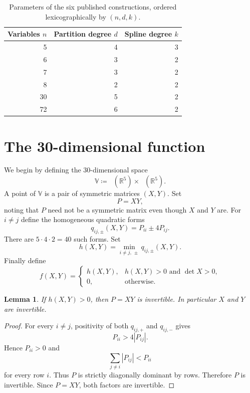 \documentclass[11pt]{amsart}
\newtheorem{lemma}[theorem]{Lemma}
\theoremstyle{remark}
\DeclareMathOperator{\Sym}{\mathsf{S}^2}
\begin{document}
\begin{table}[htb]
\centering
\caption{Parameters of the six published constructions, ordered lexicographically by $(n,d,k)$.}
\label{tab:counterexamples}
\begin{tabular}{rrr}
\hline
Variables $n$ & Partition degree $d$ & Spline degree $k$ \\
\hline
5  & 4 & 3 \\
6  & 3 & 2 \\
7  & 3 & 2 \\
8  & 2 & 2 \\
30 & 5 & 2 \\
72 & 6 & 2 \\
\hline
\end{tabular}
\end{table}

\section{The 30-dimensional function}

We begin by defining the $30$-dimensional space
\[
\mathbb{V} \coloneqq \Sym(\mathbb{R}^5)\times\Sym(\mathbb{R}^5).
\]
A point of $\mathbb{V}$ is a pair of symmetric matrices $(X,Y)$. Set
\[
P=XY,
\]
noting that $P$ need not be a symmetric matrix even though $X$ and $Y$ are. For $i\ne j$ define the homogeneous quadratic forms
\[
q_{ij,\pm}(X,Y)=P_{ii}\pm 4 P_{ij}.
\]
There are $5\cdot4\cdot2=40$ such forms. Set
\[
h(X,Y)=\min_{i\ne j,\, \pm}q_{ij, \pm}(X,Y).
\]
Finally define
\begin{equation}\label{eq:counterexample}
f(X,Y)=
\begin{cases}
h(X,Y),& h(X,Y)>0\text{ and }\det X>0,\\[2mm]
0,&\text{otherwise}.
\end{cases}
\end{equation}

\begin{lemma}
If $h(X,Y)>0$, then $P=XY$ is invertible. In particular $X$ and $Y$ are invertible.
\end{lemma}
\begin{proof}
For every $i\ne j$, positivity of both $q_{ij,+}$ and $q_{ij,-}$ gives
\[
P_{ii}>4|P_{ij}|.
\]
Hence $P_{ii}>0$ and
\[
\sum_{j\ne i}|P_{ij}|<P_{ii}
\]
for every row $i$. Thus $P$ is strictly diagonally dominant by rows. Therefore $P$ is invertible. Since $P=XY$, both factors are invertible.
\end{proof}
\end{document}
